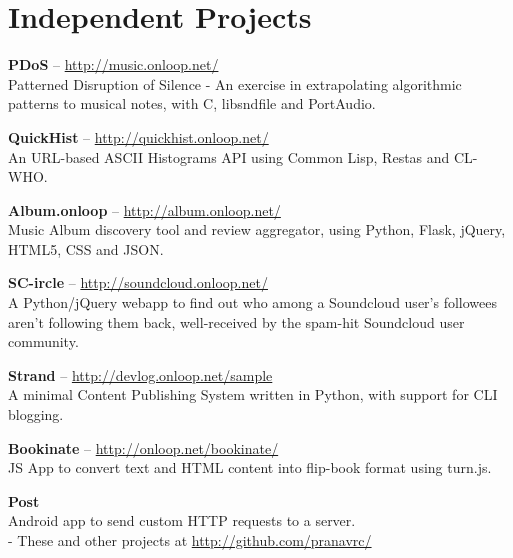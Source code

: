 \documentclass[10pt,a4paper]{moderncv}
\begin{document}

\section{Independent Projects}

\cvlistitem
{\textbf{PDoS} -- {{\href{http://music.onloop.net/}{\small http://music.onloop.net/}}}
  \\Patterned Disruption of Silence - An exercise in extrapolating algorithmic patterns to musical notes, with C, libsndfile and PortAudio.}

\cvlistitem
{\textbf{QuickHist} -- {{\href{http://quickhist.onloop.net/}{\small http://quickhist.onloop.net/}}}
  \\An URL-based ASCII Histograms API using Common Lisp, Restas and CL-WHO.}

\cvlistitem
{\textbf{Album.onloop} -- {{\href{http://album.onloop.net/}{\small http://album.onloop.net/}}}
  \\Music Album discovery tool and review aggregator, using Python, Flask, jQuery, HTML5, CSS and JSON.}

\cvlistitem
{\textbf{SC-ircle} -- {{\href{http://soundcloud.onloop.net/}{\small http://soundcloud.onloop.net/}}}
  \\A Python/jQuery webapp to find out who among a Soundcloud user's followees aren't following them back, well-received by the spam-hit Soundcloud user community.}

\cvlistitem
{\textbf{Strand} -- {{\href{http://devlog.onloop.net/sample}{\small http://devlog.onloop.net/sample}}}
  \\A minimal Content Publishing System written in Python, with support for CLI blogging.}

\cvlistitem
{\textbf{Bookinate} -- {{\href{http://onloop.net/bookinate}{\small http://onloop.net/bookinate/}}}
  \\JS App to convert text and HTML content into flip-book format using turn.js.}

\cvlistitem
{\textbf{Post}
 \\Android app to send custom HTTP requests to a server.\\ - These and other projects at {\href{http://github.com/pranavrc}{http://github.com/pranavrc/}}}


\end{document}
